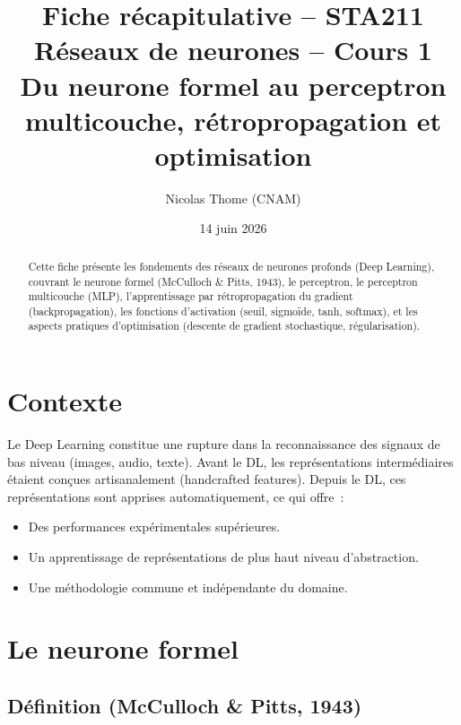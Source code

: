 \documentclass[a4paper,11pt]{article}
\title{\textbf{Fiche r\'ecapitulative -- STA211}\\[4pt]
\large R\'eseaux de neurones -- Cours 1 \\[2pt]
\small Du neurone formel au perceptron multicouche, r\'etropropagation
et optimisation}
\author{Nicolas Thome (CNAM)}
\date{14 juin 2026}
\theoremstyle{definition}
\theoremstyle{remark}
\begin{document}
\maketitle
\thispagestyle{empty}

\begin{abstract}
Cette fiche pr\'esente les fondements des r\'eseaux de neurones
profonds (Deep Learning), couvrant le neurone formel (McCulloch \&
Pitts, 1943), le perceptron, le perceptron multicouche (MLP),
l'apprentissage par r\'etropropagation du gradient (backpropagation),
les fonctions d'activation (seuil, sigmo\"ide, tanh, softmax),
et les aspects pratiques d'optimisation (descente de gradient
stochastique, r\'egularisation).
\end{abstract}

\vfill
\tableofcontents
\newpage

\section{Contexte}

Le Deep Learning constitue une rupture dans la reconnaissance des
signaux de bas niveau (images, audio, texte). Avant le DL, les
repr\'esentations interm\'ediaires \'etaient con\c{c}ues
artisanalement (handcrafted features). Depuis le DL, ces
repr\'esentations sont apprises automatiquement, ce qui offre~:
\begin{itemize}
  \item Des performances exp\'erimentales sup\'erieures.
  \item Un apprentissage de repr\'esentations de plus haut niveau
    d'abstraction.
  \item Une m\'ethodologie commune et ind\'ependante du domaine.
\end{itemize}

\section{Le neurone formel}

\subsection{D\'efinition (McCulloch \& Pitts, 1943)}
\end{document}
